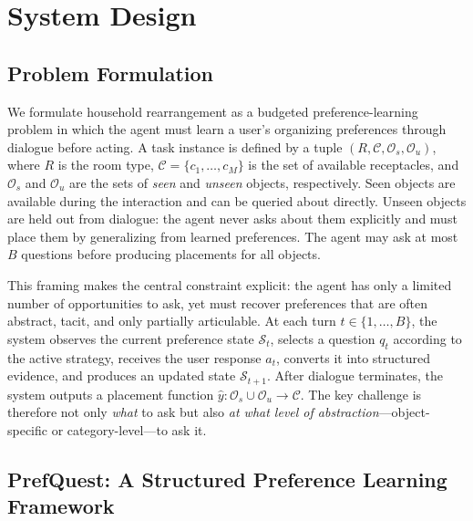 \documentclass[manuscript,review,anonymous]{acmart}
\newcommand{\revstart}{\color{revcolor}}  %
\renewcommand{\revstart}{}
\begin{document}
\section{System Design}
\label{sec:system-design}
{\revstart

\subsection{Problem Formulation}
\label{sec:task-formulation}

We formulate household rearrangement as a budgeted preference-learning problem in which the agent must learn a user's organizing preferences through dialogue before acting. A task instance is defined by a tuple $(R, \mathcal{C}, \mathcal{O}_s, \mathcal{O}_u)$, where $R$ is the room type, $\mathcal{C} = \{c_1, \dots, c_M\}$ is the set of available receptacles, and $\mathcal{O}_s$ and $\mathcal{O}_u$ are the sets of \textit{seen} and \textit{unseen} objects, respectively. Seen objects are available during the interaction and can be queried about directly. Unseen objects are held out from dialogue: the agent never asks about them explicitly and must place them by generalizing from learned preferences. The agent may ask at most $B$ questions before producing placements for all objects.

This framing makes the central constraint explicit: the agent has only a limited number of opportunities to ask, yet must recover preferences that are often abstract, tacit, and only partially articulable. At each turn $t \in \{1, \dots, B\}$, the system observes the current preference state $\mathcal{S}_t$, selects a question $q_t$ according to the active strategy, receives the user response $a_t$, converts it into structured evidence, and produces an updated state $\mathcal{S}_{t+1}$. After dialogue terminates, the system outputs a placement function $\hat{y}: \mathcal{O}_s \cup \mathcal{O}_u \rightarrow \mathcal{C}$. The key challenge is therefore not only \textit{what} to ask but also \textit{at what level of abstraction}---object-specific or category-level---to ask it.

\subsection{PrefQuest: A Structured Preference Learning Framework}
\label{sec:prefquest}

}
\end{document}
